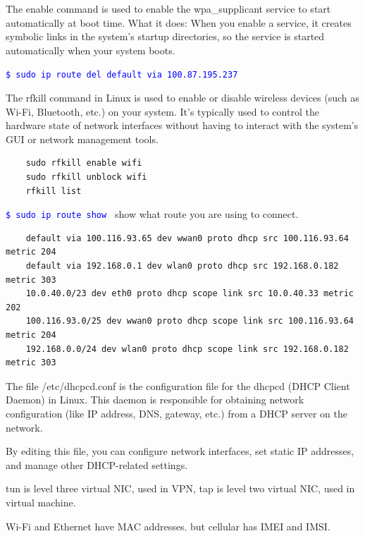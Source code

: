 \documentclass[paper=8.5in:11in, twoside, 12pt, pagesize=pdftex]{book}
\newcommand{\linuxcommand}[1]{\texttt{\textcolor{blue}{\$ #1 \Pisymbol{psy}{191}}}}
\begin{document}
		\par The enable command is used to enable the wpa\_supplicant service to start automatically at boot time. What it does: When you enable a service, it creates symbolic links in the system’s startup directories, so the service is started automatically when your system boots.
	
		\par \linuxcommand{sudo ip route del default via 100.87.195.237}
	
		\par The rfkill command in Linux is used to enable or disable wireless devices (such as Wi-Fi, Bluetooth, etc.) on your system. It's typically used to control the hardware state of network interfaces without having to interact with the system's GUI or network management tools.
		
	\begin{lstlisting}
	sudo rfkill enable wifi
	sudo rfkill unblock wifi
	rfkill list
	\end{lstlisting}
	
		
		\par \linuxcommand{sudo ip route show} show what route you are using to connect. 
	\begin{lstlisting}
	default via 100.116.93.65 dev wwan0 proto dhcp src 100.116.93.64 metric 204
	default via 192.168.0.1 dev wlan0 proto dhcp src 192.168.0.182 metric 303
	10.0.40.0/23 dev eth0 proto dhcp scope link src 10.0.40.33 metric 202
	100.116.93.0/25 dev wwan0 proto dhcp scope link src 100.116.93.64 metric 204
	192.168.0.0/24 dev wlan0 proto dhcp scope link src 192.168.0.182 metric 303
	\end{lstlisting}
	
		\par The file /etc/dhcpcd.conf is the configuration file for the dhcpcd (DHCP Client Daemon) in Linux. This daemon is responsible for obtaining network configuration (like IP address, DNS, gateway, etc.) from a DHCP server on the network.
	
		\par By editing this file, you can configure network interfaces, set static IP addresses, and manage other DHCP-related settings.
	

	\par tun is level three virtual NIC, used in VPN, tap is level two virtual NIC, used in virtual machine.

\par Wi-Fi and Ethernet have MAC addresses. but cellular has IMEI and IMSI.
\end{document}
